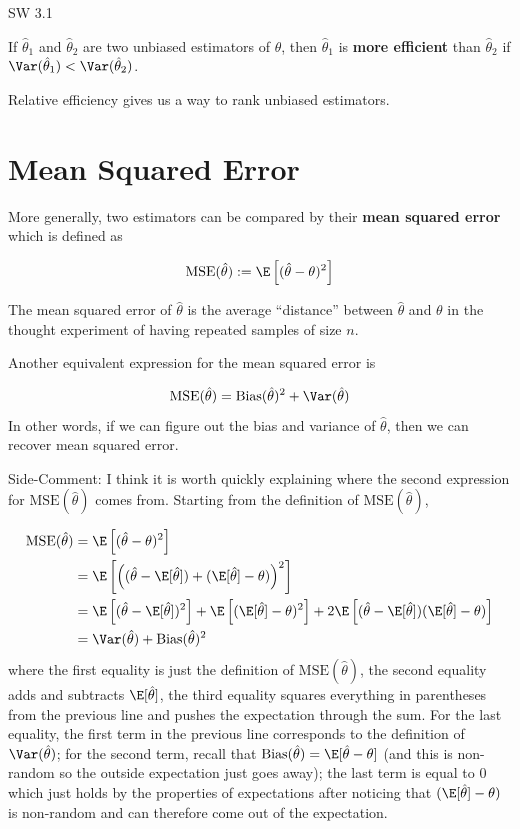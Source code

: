 \documentclass[
  letterpaper,
  DIV=11,
  numbers=noendperiod]{scrreprt}
\begin{document}
SW 3.1

If \(\hat{\theta}_1\) and \(\hat{\theta}_2\) are two unbiased estimators
of \(\theta\), then \(\hat{\theta}_1\) is \textbf{more efficient} than
\(\hat{\theta}_2\) if \(\Var(\hat{\theta}_1) < \Var(\hat{\theta}_2)\).

Relative efficiency gives us a way to rank unbiased estimators.

\section{Mean Squared Error}\label{mean-squared-error}

More generally, two estimators can be compared by their \textbf{mean
squared error} which is defined as

\[
  \textrm{MSE}(\hat{\theta}) := \E\left[ (\hat{\theta} - \theta)^2\right]
\]

The mean squared error of \(\hat{\theta}\) is the average ``distance''
between \(\hat{\theta}\) and \(\theta\) in the thought experiment of
having repeated samples of size \(n\).

Another equivalent expression for the mean squared error is

\[
  \textrm{MSE}(\hat{\theta}) = \textrm{Bias}(\hat{\theta})^2 + \Var(\hat{\theta})
\] In other words, if we can figure out the bias and variance of
\(\hat{\theta}\), then we can recover mean squared error.

{Side-Comment:} I think it is worth quickly explaining where the second
expression for \(\textrm{MSE}(\hat{\theta})\) comes from. Starting from
the definition of \(\textrm{MSE}(\hat{\theta})\),

\[
  \begin{aligned}
    \textrm{MSE}(\hat{\theta}) &= \E\left[ (\hat{\theta} - \theta)^2\right] \\
    &= \E\left[ \left( (\hat{\theta} - \E[\hat{\theta}]) + (\E[\hat{\theta}] - \theta)\right)^2 \right] \\
    &= \E\left[ (\hat{\theta} - \E[\hat{\theta}])^2 \right] + \E\left[ (\E[\hat{\theta}] - \theta)^2\right] + 2 \E\left[ (\hat{\theta} - \E[\hat{\theta}])(\E[\hat{\theta}] - \theta) \right] \\
    &= \Var(\hat{\theta}) + \textrm{Bias}(\hat{\theta})^2 
  \end{aligned}
\] where the first equality is just the definition of
\(\textrm{MSE}(\hat{\theta})\), the second equality adds and subtracts
\(\E[\hat{\theta}]\), the third equality squares everything in
parentheses from the previous line and pushes the expectation through
the sum. For the last equality, the first term in the previous line
corresponds to the definition of \(\Var(\hat{\theta})\); for the second
term, recall that
\(\textrm{Bias}(\hat{\theta}) = \E[\hat{\theta}-\theta]\) (and this is
non-random so the outside expectation just goes away); the last term is
equal to 0 which just holds by the properties of expectations after
noticing that \((\E[\hat{\theta}] - \theta)\) is non-random and can
therefore come out of the expectation.
\end{document}
